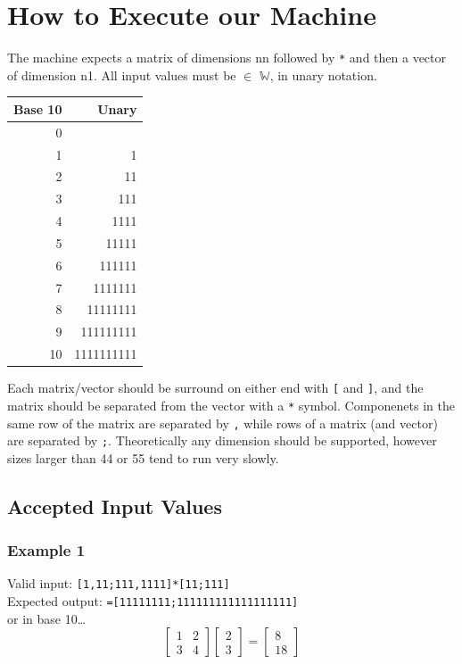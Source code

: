 \documentclass[letterpaper, 11pt]{article}
\begin{document}
\section{How to Execute our Machine}
\label{sec:org11644ff}
The machine expects a matrix of dimensions n\texttimes{}n followed by \texttt{*} and then a vector of dimension n\texttimes{}1. All input values must be \(\in\) \(\mathbb{W}\), in unary notation.\\

\begin{center}
\begin{tabular}{r|r}
Base 10 & Unary\\
\hline
0 & \\
1 & 1\\
2 & 11\\
3 & 111\\
4 & 1111\\
5 & 11111\\
6 & 111111\\
7 & 1111111\\
8 & 11111111\\
9 & 111111111\\
10 & 1111111111\\
\end{tabular}
\end{center}

Each matrix/vector should be surround on either end with \texttt{[} and \texttt{]}, and the matrix should be separated from the vector with a \texttt{*} symbol. Componenets in the same row of the matrix are separated by \texttt{,} while rows of a matrix (and vector) are separated by \texttt{;}. Theoretically any dimension should be supported, however sizes larger than 4\texttimes{}4 or 5\texttimes{}5 tend to run very slowly.\\
\subsection{Accepted Input Values}
\label{sec:orgb6e3ec2}
\subsubsection{Example 1}
\label{sec:org2d8b9a9}
Valid input: \texttt{[1,11;111,1111]*[11;111]}\\
Expected output: \texttt{=[11111111;111111111111111111]}\\
or in base 10\ldots{}\\
\[\begin{bmatrix}1&2\\3&4\end{bmatrix}\begin{bmatrix}2\\3\end{bmatrix} = \begin{bmatrix}8\\18\end{bmatrix}\]\\
\end{document}
